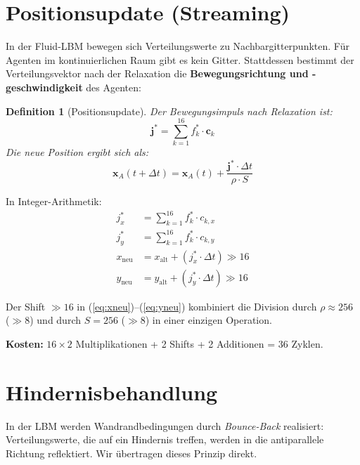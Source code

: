 \documentclass[11pt,a4paper]{article}
\newtheorem{definition}{Definition}
\begin{document}
\section{Positionsupdate (Streaming)}\label{sec:streaming}

In der Fluid-LBM bewegen sich Verteilungswerte zu Nachbargitterpunkten.
F\"ur Agenten im kontinuierlichen Raum gibt es kein Gitter.
Stattdessen bestimmt der Verteilungsvektor nach der Relaxation
die \textbf{Bewegungsrichtung und -geschwindigkeit} des Agenten:

\begin{definition}[Positionsupdate]
Der Bewegungsimpuls nach Relaxation ist:
\begin{equation}
\mathbf{j}^* = \sum_{k=1}^{16} f^*_k \cdot \mathbf{c}_k
\end{equation}
Die neue Position ergibt sich als:
\begin{equation}
\mathbf{x}_A(t+\Delta t) = \mathbf{x}_A(t) + \frac{\mathbf{j}^* \cdot \Delta t}{\rho \cdot S}
\end{equation}
\end{definition}

In Integer-Arithmetik:
\begin{align}
j^*_x &= \sum_{k=1}^{16} f^*_k \cdot c_{k,x} \\
j^*_y &= \sum_{k=1}^{16} f^*_k \cdot c_{k,y} \\
x_{\mathrm{neu}} &= x_{\mathrm{alt}} + (j^*_x \cdot \Delta t) \gg 16 \label{eq:xneu}\\
y_{\mathrm{neu}} &= y_{\mathrm{alt}} + (j^*_y \cdot \Delta t) \gg 16 \label{eq:yneu}
\end{align}

Der Shift $\gg 16$ in (\ref{eq:xneu})--(\ref{eq:yneu}) kombiniert die Division durch $\rho \approx 256$ ($\gg 8$)
und durch $S = 256$ ($\gg 8$) in einer einzigen Operation.

\textbf{Kosten:} $16 \times 2$ Multiplikationen + 2 Shifts + 2 Additionen = 36 Zyklen.

\section{Hindernisbehandlung}\label{sec:bounce}

In der LBM werden Wandrandbedingungen durch \textit{Bounce-Back} realisiert:
Verteilungswerte, die auf ein Hindernis treffen, werden in die antiparallele Richtung reflektiert.
Wir \"ubertragen dieses Prinzip direkt.
\end{document}
